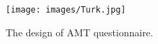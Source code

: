\documentclass[12pt,a4paper]{report}
\theoremstyle{definition}
\begin{document}
\begin{CJK}{UTF8}{bsmi}
    
    \begin{figure}[H]
        \texttt{[image: images/Turk.jpg]}
        \caption{The design of AMT questionnaire.}
        \label{fig:AMT}
    \end{figure} 
     

\end{CJK}
\end{document}
